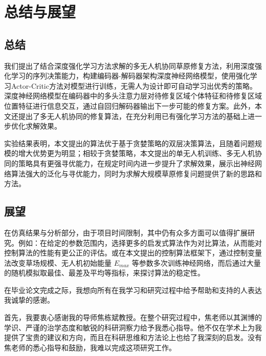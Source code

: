 \documentclass[AutoFakeBold]{LZUThesis}
\begin{document}
\chapter{总结与展望}

\section{总结}
我们提出了结合深度强化学习方法求解的多无人机协同草原修复方法，利用深度强化学习的序列决策能力，构建编码器-解码器架构深度神经网络模型，使用强化学习Actor-Critic方法对模型进行训练，无需人为设计即可自动学习出优秀的策略。深度神经网络模型在编码器中的多头注意力层对待修复区域个体特征和待修复区域位置特征进行信息交互，通过自回归解码器输出下一步可能的修复方案。此外，本文还提出了多无人机协同的修复算法，在充分利用已有强化学习方法的基础上进一步优化求解效果。

实验结果表明，本文提出的算法优于基于贪婪策略的双层决策算法，且随着问题规模的增大优势更为明显；相较于贪婪策略，本文提出的单无人机训练、多无人机协同的策略具有更强寻优能力，在规定时间内进一步提升了求解效果，展示出神经网络算法强大的泛化与寻优能力，同时为求解大规模草原修复问题提供了新的思路和方法。

\section{展望}
在仿真结果与分析部分，由于项目时间限制，其中仍有众多方面可以值得扩展研究。例如：在给定的参数范围内，选择更多的启发式算法作为对比算法，从而能对控制算法的性能有更公正的评估。或在本文提出的控制算法框架下，通过控制变量法改变草场规模、无人机初始能量 $E_{max}$ 等参数多次训练神经网络，而后通过大量的随机模拟取最佳、最差及平均等指标，来探讨算法的稳定性。


\backmatter
\printbib




\Thanks

在毕业论文完成之际，我想向所有在我学习和研究过程中给予帮助和支持的人表达我诚挚的感谢。

首先，我要衷心感谢我的导师焦栋斌教授。在整个研究过程中，焦老师以其渊博的学识、严谨的治学态度和敏锐的科研洞察力给予我悉心指导。他不仅在学术上为我提供了宝贵的建议和方向，而且在科研思维和方法论上也给了我深刻的启发。没有焦老师的悉心指导和鼓励，我难以完成这项研究工作。
\end{document}
